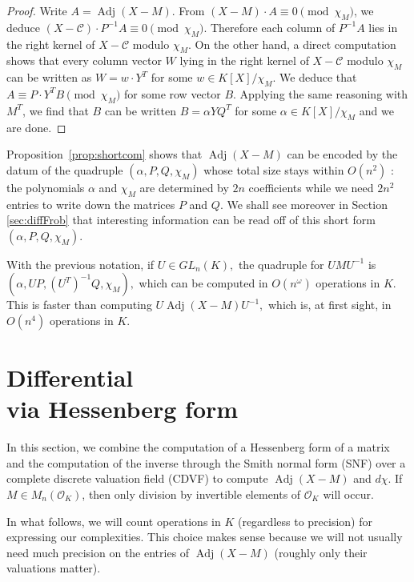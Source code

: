 \documentclass{sig-alternate-05-2015}
\DeclareMathOperator{\adj}{Adj}
\newcommand{\OK}{\mathcal{O}_K}
\begin{document}
\begin{proof}
Write $A = \adj(X{-}M)$. From $(X{-}M) \cdot A \equiv 0 
\pmod{\chi_M}$, we deduce $(X{-}\mathscr{C}) \cdot P^{-1} A \equiv 0 \pmod{\chi_M}$. 
Therefore each column of $P^{-1} A$ lies in the right kernel of $X{-}\mathscr{C}$
modulo $\chi_M$. On the other hand, a direct computation shows that
every column vector $W$ lying in the right kernel of $X{-}\mathscr{C}$ modulo 
$\chi_M$ can be written as $W = w \cdot Y^T$ for some $w \in 
K[X]/\chi_M$. We deduce that $A \equiv P \cdot Y^T B \pmod{\chi_M}$
for some row vector $B$.
Applying the same reasoning with $M^T$, we find that $B$ can be
written $B = \alpha Y Q^T$ for some $\alpha \in K[X]/\chi_M$ and
we are done.
\end{proof}

Proposition~\ref{prop:shortcom} shows that $\adj(X{-}M)$ can be encoded 
by the datum of the quadruple $(\alpha, P, Q, \chi_M)$ whose total size 
stays within $O(n^2)$ : the polynomials $\alpha$ and $\chi_M$ are 
determined by $2n$ coefficients while we need $2n^2$ entries to 
write down the matrices $P$ and $Q$. 
We shall see moreover in Section \ref{sec:diffFrob} that interesting
information can be read off of this short form $(\alpha, P, Q, 
\chi_M)$.

\begin{rem}
With the previous notation, if $U \in GL_n(K),$
the quadruple for 
$UMU^{-1}$ is
$(\alpha, UP, (U^T)^{-1}Q, \chi_M),$
which can be computed in $O(n^\omega)$ operations in $K.$
This is faster than computing $U \adj(X-M) U^{-1},$
which is, at first sight, in $O(n^4)$ operations in $K.$
\end{rem}

\section{Differential\\via Hessenberg form}
\label{sec:diffHess}

In this section, we combine the computation of a Hessenberg form of a 
matrix and the computation of the inverse through the Smith normal form 
(SNF) over a complete discrete valuation field (CDVF) to compute 
$\adj(X{-}M)$ and $d \chi$. If $M \in M_n(\OK)$, then only division 
by invertible elements of $\OK$ will occur.

\begin{rem}
In what follows, we will count operations in $K$ (regardless to 
precision) for expressing our complexities. This choice makes sense 
because we will not usually need much precision on the entries of 
$\adj(X{-}M)$ (roughly only their valuations matter).
\end{rem}
\end{document}
